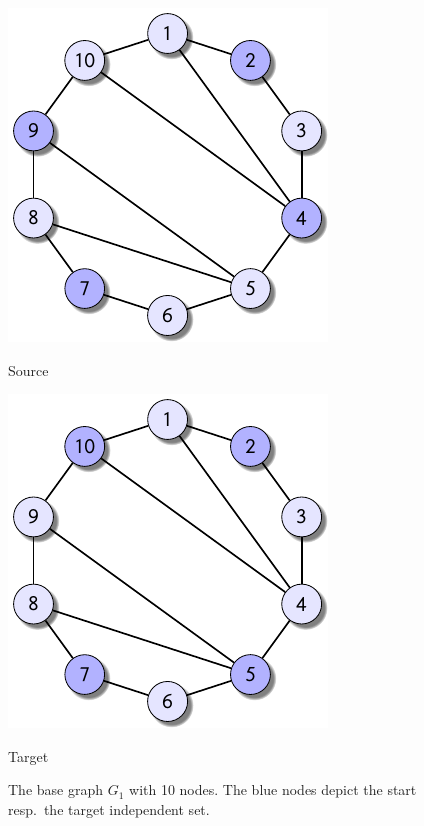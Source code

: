 \documentclass{article}
\begin{document}
\begin{figure}[ht]
  \begin{minipage}{0.49\textwidth}
    \centering
    \includegraphics{figures/graph_010_source.pdf}

    Source
  \end{minipage}\hfill
  \begin{minipage}{0.49\textwidth}
    \centering
    \includegraphics{figures/graph_010_target.pdf}

    Target
  \end{minipage}
  \caption{The base graph $G_{1}$ with 10 nodes. The blue nodes
    depict the start resp.\ the target independent set.}\label{fig:base_c_1}
\end{figure}
\end{document}
